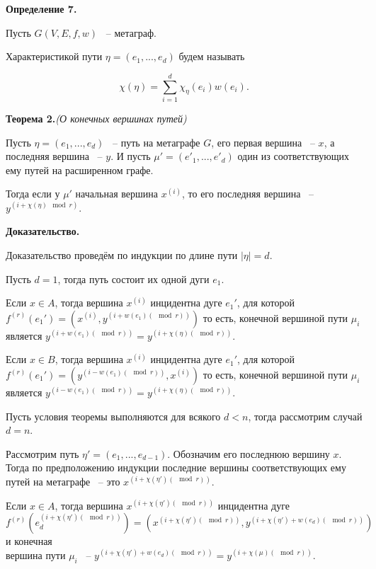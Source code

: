 \documentclass[14pt]{mmcs-article}
\begin{document}
\textbf{Определение 7.}

Пусть $G(V, E, f, w)$ ~-- метаграф.

Характеристикой пути $\eta = (e_1, ..., e_d)$ будем называть

\[
    \chi(\eta) = \sum_{i = 1}^d \chi_{\eta}(e_i) w(e_i).
\]

\textbf{Теорема 2.}\textsl{(О конечных вершинах путей)}

Пусть  $\eta = (e_1, ..., e_d)$ ~-- путь на метаграфе $G$, его первая вершина ~-- $x$, а последняя вершина ~-- $y$. И пусть $\mu' = (e'_1, ..., e'_d)$ один из соответствующих ему путей на расширенном графе.

Тогда если у $\mu'$ начальная вершина $x^{(i)}$, то его последняя вершина ~-- $y^{(i + \chi(\eta)\mod{r})}$.

\textbf{Доказательство.}


Доказательство проведём по индукции по длине пути $|\eta| = d$.

Пусть $d = 1$, тогда путь состоит их одной дуги $e_1$.

Если $x \in A$, тогда вершина $x^{(i)}$ инцидентна дуге $e_1'$, для которой $f^{(r)}(e_1') = (x^{(i)}, y^{(i + w(e_1) (\mod{r}))})$ то есть, конечной вершиной пути $\mu_i$ является $y^{(i + w(e_1) (\mod{r}))} = y^{(i + \chi(\eta) (\mod{r}))}$.

Если $x \in B$, тогда вершина $x^{(i)}$ инцидентна дуге $e_1'$, для которой $f^{(r)}(e_1') = (y^{(i - w(e_1) (\mod{r}))}, x^{(i)})$ то есть, конечной вершиной пути $\mu_i$ является $y^{(i - w(e_1) (\mod{r}))} = y^{(i + \chi(\eta) (\mod{r}))}$.

Пусть условия теоремы выполняются для всякого $d < n$, тогда рассмотрим случай $d = n$.

Рассмотрим путь $\eta' = (e_1, ..., e_{d - 1})$. Обозначим его последнюю вершину $x$. Тогда по предположению индукции последние вершины соответствующих ему путей на метаграфе ~-- это $x^{(i + \chi(\eta')(\mod{r}))}$.

Если $x \in A$, тогда вершина $x^{(i + \chi(\eta')(\mod{r}))}$ инцидентна дуге \\ $f^{(r)}(e_d^{(i + \chi(\eta')(\mod{r}))}) = (x^{(i + \chi(\eta')(\mod{r}))}, y^{(i + \chi(\eta') + w(e_d) (\mod{r}))})$ и конечная \\ вершина пути $\mu_i$ ~-- $y^{(i + \chi(\eta') + w(e_d) (\mod{r}))} = y^{(i + \chi(\mu) (\mod{r}))}$.
\end{document}
